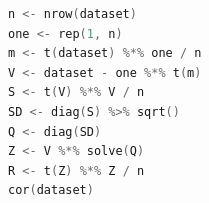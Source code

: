 \begin{lstlisting}[language=c++,label={code:09_07},caption={データの行列演算}]
n <- nrow(dataset)
one <- rep(1, n)
m <- t(dataset) %*% one / n
V <- dataset - one %*% t(m)
S <- t(V) %*% V / n
SD <- diag(S) %>% sqrt()
Q <- diag(SD)
Z <- V %*% solve(Q)
R <- t(Z) %*% Z / n
cor(dataset)
\end{lstlisting}
